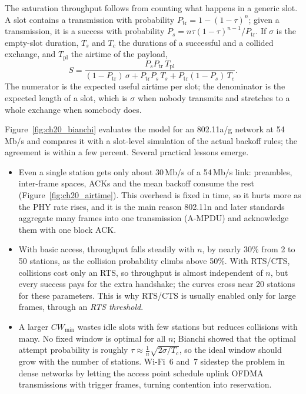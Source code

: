 
\begin{deeper}
The saturation throughput follows from counting what happens in a generic slot. A slot contains a
transmission with probability $P_{\text{tr}}=1-(1-\tau)^n$; given a transmission, it is a success with
probability $P_s=n\tau(1-\tau)^{n-1}/P_{\text{tr}}$. If $\sigma$ is the empty-slot duration, $T_s$ and $T_c$
the durations of a successful and a collided exchange, and $T_{\text{pl}}$ the airtime of the payload,
\begin{equation}
S=\frac{P_s P_{\text{tr}}\,T_{\text{pl}}}{(1-P_{\text{tr}})\,\sigma+P_{\text{tr}}P_s\,T_s+P_{\text{tr}}(1-P_s)\,T_c}.
\label{eq:ch20:bianchiS}
\end{equation}
The numerator is the expected useful airtime per slot; the denominator is the expected length of a slot,
which is $\sigma$ when nobody transmits and stretches to a whole exchange when somebody does.
\end{deeper}

Figure~\ref{fig:ch20_bianchi} evaluates the model for an 802.11a/g network at 54\,Mb/s and compares it with a
slot-level simulation of the actual backoff rules; the agreement is within a few percent. Several practical
lessons emerge.
\begin{itemize}
\item Even a single station gets only about 30\,Mb/s of a 54\,Mb/s link: preambles, inter-frame spaces,
ACKs and the mean backoff consume the rest (Figure~\ref{fig:ch20_airtime}). This overhead is fixed in time,
so it hurts more as the PHY rate rises, and it is the main reason 802.11n and later standards aggregate many
frames into one transmission (A-MPDU) and acknowledge them with one block ACK.
\item With basic access, throughput falls steadily with $n$, by nearly 30\% from 2 to 50 stations, as the
collision probability climbs above 50\%. With RTS/CTS, collisions cost only an RTS, so throughput is almost
independent of $n$, but every success pays for the extra handshake; the curves cross near 20 stations for
these parameters. This is why RTS/CTS is usually enabled only for large frames, through an \emph{RTS threshold}.
\item A larger $CW_{\min}$ wastes idle slots with few stations but reduces collisions with many. No fixed
window is optimal for all $n$; Bianchi showed that the optimal attempt probability is roughly
$\tau\approx\frac1n\sqrt{2\sigma/T_c}$, so the ideal window should grow with the number of stations. Wi-Fi~6
and~7 sidestep the problem in dense networks by letting the access point schedule uplink OFDMA transmissions
with trigger frames, turning contention into reservation.
\end{itemize}

